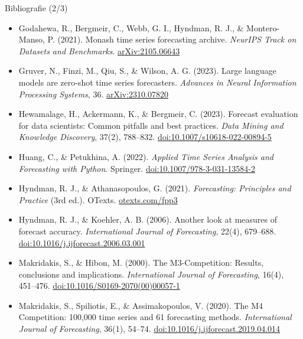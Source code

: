 \begin{frame}{Bibliografie (2/3)}
\itemsize{\scriptsize}
\begin{itemize}
    \item Godahewa, R., Bergmeir, C., Webb, G. I., Hyndman, R. J., \& Montero-Manso, P. (2021). Monash time series forecasting archive. \textit{NeurIPS Track on Datasets and Benchmarks}. \href{https://arxiv.org/abs/2105.06643}{arXiv:2105.06643}
    \item Gruver, N., Finzi, M., Qiu, S., \& Wilson, A. G. (2023). Large language models are zero-shot time series forecasters. \textit{Advances in Neural Information Processing Systems}, 36. \href{https://arxiv.org/abs/2310.07820}{arXiv:2310.07820}
    \item Hewamalage, H., Ackermann, K., \& Bergmeir, C. (2023). Forecast evaluation for data scientists: Common pitfalls and best practices. \textit{Data Mining and Knowledge Discovery}, 37(2), 788--832. \href{https://doi.org/10.1007/s10618-022-00894-5}{doi:10.1007/s10618-022-00894-5}
    \item Huang, C., \& Petukhina, A. (2022). \textit{Applied Time Series Analysis and Forecasting with Python}. Springer. \href{https://doi.org/10.1007/978-3-031-13584-2}{doi:10.1007/978-3-031-13584-2}
    \item Hyndman, R. J., \& Athanasopoulos, G. (2021). \textit{Forecasting: Principles and Practice} (3rd ed.). OTexts. \href{https://otexts.com/fpp3/}{otexts.com/fpp3}
    \item Hyndman, R. J., \& Koehler, A. B. (2006). Another look at measures of forecast accuracy. \textit{International Journal of Forecasting}, 22(4), 679--688. \href{https://doi.org/10.1016/j.ijforecast.2006.03.001}{doi:10.1016/j.ijforecast.2006.03.001}
    \item Makridakis, S., \& Hibon, M. (2000). The M3-Competition: Results, conclusions and implications. \textit{International Journal of Forecasting}, 16(4), 451--476. \href{https://doi.org/10.1016/S0169-2070(00)00057-1}{doi:10.1016/S0169-2070(00)00057-1}
    \item Makridakis, S., Spiliotis, E., \& Assimakopoulos, V. (2020). The M4 Competition: 100,000 time series and 61 forecasting methods. \textit{International Journal of Forecasting}, 36(1), 54--74. \href{https://doi.org/10.1016/j.ijforecast.2019.04.014}{doi:10.1016/j.ijforecast.2019.04.014}
\end{itemize}
\end{frame}

